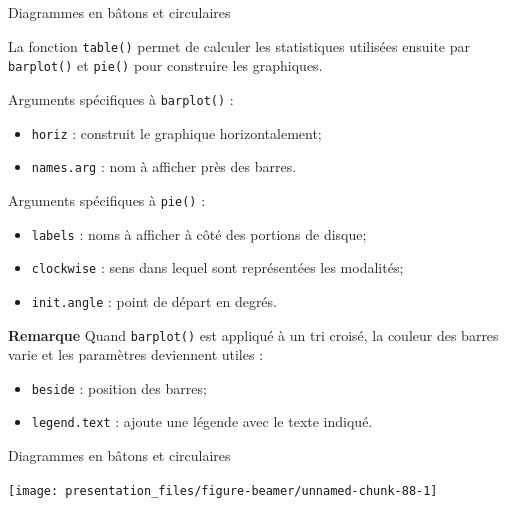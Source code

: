 \documentclass[12pt,ignorenonframetext,handout,]{beamer}
\newenvironment{Shaded}{}{}
\newcommand{\DataTypeTok}[1]{#1}
\newcommand{\KeywordTok}[1]{\textcolor[rgb]{0.00,0.00,1.00}{#1}}
\newcommand{\NormalTok}[1]{#1}
\newcommand{\OperatorTok}[1]{#1}
\newcommand{\StringTok}[1]{\textcolor[rgb]{0.00,0.50,0.50}{#1}}
\providecommand{\tightlist}{%
  \setlength{\itemsep}{0pt}\setlength{\parskip}{0pt}}
\renewenvironment{Shaded}{\begin{snugshade}}{\end{snugshade}}
\newcommand{\intertitre}[1]{\textcolor{redInsee}{\textbf{#1}}}
\begin{document}
\begin{frame}[fragile]{Diagrammes en bâtons et circulaires}
\protect\hypertarget{diagrammes-en-batons-et-circulaires}{}

La fonction \texttt{table()} permet de calculer les statistiques
utilisées ensuite par \texttt{barplot()} et \texttt{pie()} pour
construire les graphiques.

\pause Arguments spécifiques à \texttt{barplot()} : \vspace{-3mm}

\begin{itemize}
\tightlist
\item
  \texttt{horiz} : construit le graphique horizontalement;
\item
  \texttt{names.arg} : nom à afficher près des barres.
\end{itemize}

\pause Arguments spécifiques à \texttt{pie()} : \vspace{-3mm}

\begin{itemize}
\tightlist
\item
  \texttt{labels} : noms à afficher à côté des portions de disque;
\item
  \texttt{clockwise} : sens dans lequel sont représentées les modalités;
\item
  \texttt{init.angle} : point de départ en degrés.
\end{itemize}

\pause

\intertitre{Remarque} Quand \texttt{barplot()} est appliqué à un tri
croisé, la couleur des barres varie et les paramètres deviennent utiles
: \vspace{-3mm}

\begin{itemize}
\tightlist
\item
  \texttt{beside} : position des barres;
\item
  \texttt{legend.text} : ajoute une légende avec le texte indiqué.
\end{itemize}

\end{frame}

\begin{frame}[fragile]{Diagrammes en bâtons et circulaires}
\protect\hypertarget{diagrammes-en-batons-et-circulaires-1}{}

\centering \footnotesize

\begin{Shaded}
\end{Shaded}

\texttt{[image: presentation\_files/figure-beamer/unnamed-chunk-88-1]}

\end{frame}
\end{document}
